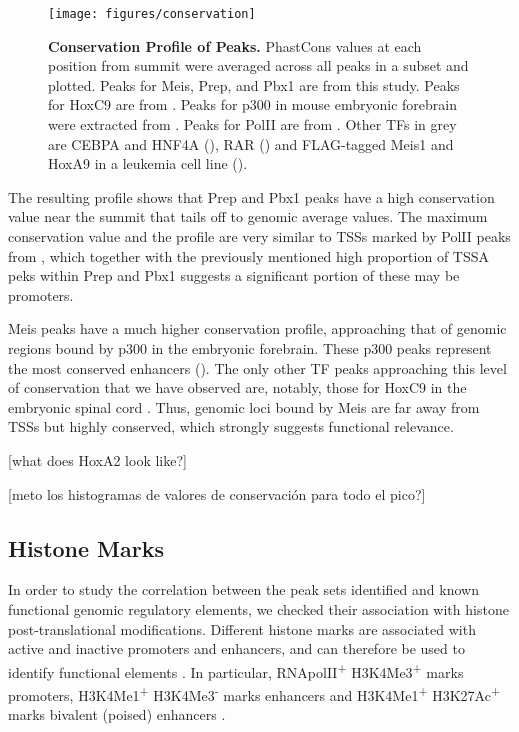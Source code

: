\begin{figure}[]
  \centering
  \texttt{[image: figures/conservation]}
  \caption[Conservation Profile of Peaks]{\textbf{Conservation Profile of Peaks.} PhastCons values at each position from summit were averaged across all peaks in a subset and plotted. Peaks for Meis, Prep, and Pbx1 are from this study. Peaks for HoxC9 are from \cite{Jung2010}. Peaks for p300 in mouse embryonic forebrain were extracted from \cite{Blow2010}. Peaks for PolII are from \cite{Mahony2011}. Other TFs in grey are CEBPA and HNF4A (\cite{Schmidt2010}), RAR (\cite{Mahony2011}) and FLAG-tagged Meis1 and HoxA9 in a leukemia cell line (\cite{Huang2012}).}
  \label{fig:conservation}
\end{figure}

The resulting profile shows that Prep and Pbx1 peaks have a high conservation value near the summit that tails off to genomic average values. The maximum conservation value and the profile are very similar to \acp{TSS} marked by \ac{PolII} peaks from \cite{Mahony2011}, which together with the previously mentioned high proportion of \ac{TSSA} peks within Prep and Pbx1 suggests a significant portion of these may be promoters.

Meis peaks have a much higher conservation profile, approaching that of genomic regions bound by p300 in the embryonic forebrain. These p300 peaks represent the most conserved enhancers (\cite{Blow2010}). The only other \ac{TF} peaks approaching this level of conservation that we have observed are, notably, those for HoxC9 in the embryonic spinal cord \cite{Jung2010}. Thus, genomic loci bound by Meis are far away from \acp{TSS} but highly conserved, which strongly suggests functional relevance.

[what does HoxA2 look like?] 

[meto los histogramas de valores de conservación para todo el pico?]

\subsection{Histone Marks}

In order to study the correlation between the peak sets identified and known functional genomic regulatory elements, we checked their association with histone post-translational modifications. Different histone marks are associated with active and inactive promoters and enhancers, and can therefore be used to identify functional elements \parencite{Mikkelsen2007}. In particular, RNApolII\textsuperscript{+} H3K4Me3\textsuperscript{+} marks promoters,  H3K4Me1\textsuperscript{+} H3K4Me3\textsuperscript{-} marks enhancers and H3K4Me1\textsuperscript{+} H3K27Ac\textsuperscript{+} marks bivalent (poised) enhancers \parencite{Creyghton2010}. 

